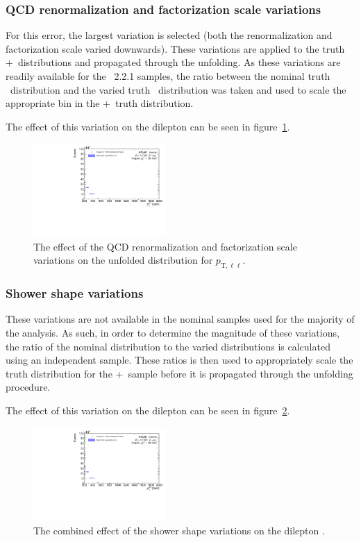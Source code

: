 \subsubsection{QCD renormalization and factorization scale variations}
For this error, the largest variation is selected (both the renormalization and factorization scale varied downwards). These variations are applied to the truth \powheg+\pythia~distributions and propagated through the unfolding. As these variations are readily available for the \sherpa~2.2.1 samples, the ratio between the nominal truth \sherpa~distribution and the varied truth \sherpa~distribution was taken and used to scale the appropriate bin in the \powheg+\pythia~truth distribution.

The effect of this variation on the dilepton \pt can be seen in figure~\ref{fig:qcdSystErr}.

\begin{figure}[h!]
  \centering
  \includegraphics[page=26,width=0.45\textwidth]{figures/unfoldErrPlots.pdf}
  \caption{The effect of the QCD renormalization and factorization scale variations on the unfolded distribution for $p_{\text{T},\ell\ell}$.}
  \label{fig:qcdSystErr}
\end{figure}

\subsubsection{Shower shape variations}
These variations are not available in the nominal samples used for the majority of the analysis. As such, in order to determine the magnitude of these variations, the ratio of the nominal distribution to the varied distributions is calculated using an independent sample. These ratios is then used to appropriately scale the truth distribution for the \powheg+\pythia~sample before it is propagated through the unfolding procedure.

The effect of this variation on the dilepton \pt can be seen in figure~\ref{fig:showerSystErr}.

\begin{figure}[h!]
  \centering
  \includegraphics[page=28,width=0.45\textwidth]{figures/unfoldErrPlots.pdf}
  \caption{The combined effect of the shower shape variations on the dilepton \pt.}
  \label{fig:showerSystErr}
\end{figure}

